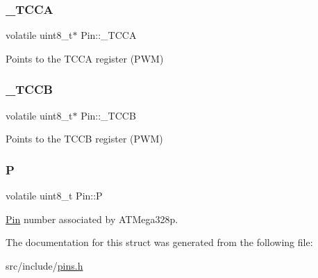 \subsubsection{\texorpdfstring{\+\_\+\+T\+C\+CA}{\_TCCA}}
{\footnotesize\ttfamily volatile uint8\+\_\+t$\ast$ Pin\+::\+\_\+\+T\+C\+CA}



Points to the T\+C\+CA register (P\+WM) 

\mbox{\label{structPin_a6e90b8ac6b2648d09ac6e7374bec1038}} 
\subsubsection{\texorpdfstring{\+\_\+\+T\+C\+CB}{\_TCCB}}
{\footnotesize\ttfamily volatile uint8\+\_\+t$\ast$ Pin\+::\+\_\+\+T\+C\+CB}



Points to the T\+C\+CB register (P\+WM) 

\mbox{\label{structPin_a618d69729d75bd51e89634bc81fcf49d}} 
\subsubsection{\texorpdfstring{P}{P}}
{\footnotesize\ttfamily volatile uint8\+\_\+t Pin\+::P}



\mbox{\hyperlink{structPin}{Pin}} number associated by A\+T\+Mega328p. 



The documentation for this struct was generated from the following file\+:\begin{DoxyCompactItemize}
\item 
src/include/\mbox{\hyperlink{pins_8h}{pins.\+h}}\end{DoxyCompactItemize}
